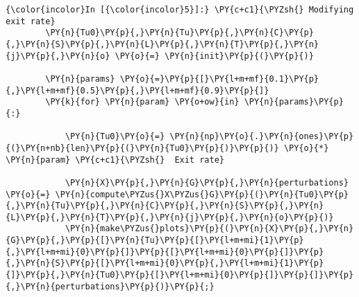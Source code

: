     \begin{Verbatim}[commandchars=\\\{\}]
{\color{incolor}In [{\color{incolor}5}]:} \PY{c+c1}{\PYZsh{} Modifying exit rate}
        \PY{n}{Tu0}\PY{p}{,}\PY{n}{Tu}\PY{p}{,}\PY{n}{C}\PY{p}{,}\PY{n}{S}\PY{p}{,}\PY{n}{L}\PY{p}{,}\PY{n}{T}\PY{p}{,}\PY{n}{j}\PY{p}{,}\PY{n}{o} \PY{o}{=} \PY{n}{init}\PY{p}{(}\PY{p}{)}
        
        \PY{n}{params} \PY{o}{=}\PY{p}{[}\PY{l+m+mf}{0.1}\PY{p}{,}\PY{l+m+mf}{0.5}\PY{p}{,}\PY{l+m+mf}{0.9}\PY{p}{]}
        \PY{k}{for} \PY{n}{param} \PY{o+ow}{in} \PY{n}{params}\PY{p}{:}
            
            \PY{n}{Tu0}\PY{o}{=} \PY{n}{np}\PY{o}{.}\PY{n}{ones}\PY{p}{(}\PY{n+nb}{len}\PY{p}{(}\PY{n}{Tu0}\PY{p}{)}\PY{p}{)} \PY{o}{*} \PY{n}{param} \PY{c+c1}{\PYZsh{}  Exit rate}
        
            \PY{n}{X}\PY{p}{,}\PY{n}{G}\PY{p}{,}\PY{n}{perturbations} \PY{o}{=} \PY{n}{compute\PYZus{}X\PYZus{}G}\PY{p}{(}\PY{n}{Tu0}\PY{p}{,}\PY{n}{Tu}\PY{p}{,}\PY{n}{C}\PY{p}{,}\PY{n}{S}\PY{p}{,}\PY{n}{L}\PY{p}{,}\PY{n}{T}\PY{p}{,}\PY{n}{j}\PY{p}{,}\PY{n}{o}\PY{p}{)}
            \PY{n}{make\PYZus{}plots}\PY{p}{(}\PY{n}{X}\PY{p}{,}\PY{n}{G}\PY{p}{,}\PY{p}{[}\PY{n}{Tu}\PY{p}{[}\PY{l+m+mi}{1}\PY{p}{,}\PY{l+m+mi}{0}\PY{p}{]}\PY{p}{[}\PY{l+m+mi}{0}\PY{p}{]}\PY{p}{,}\PY{n}{S}\PY{p}{[}\PY{l+m+mi}{0}\PY{p}{,}\PY{l+m+mi}{1}\PY{p}{]}\PY{p}{,}\PY{n}{Tu0}\PY{p}{[}\PY{l+m+mi}{0}\PY{p}{]}\PY{p}{]}\PY{p}{,}\PY{n}{perturbations}\PY{p}{)}\PY{p}{;}
\end{Verbatim}


    \begin{center}
    \end{center}
    { \hspace*{\fill} \\}
    
    \begin{center}
    \end{center}
    { \hspace*{\fill} \\}
    
    \begin{center}
    \end{center}
    { \hspace*{\fill} \\}
    
